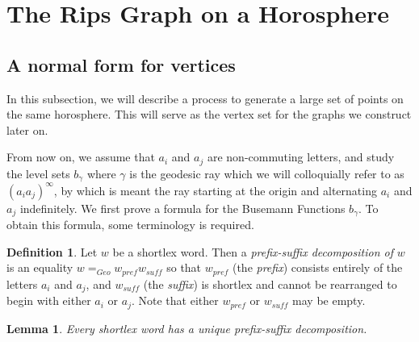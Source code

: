 \documentclass[10pt,a4paper]{amsart}
\newtheorem{lemma}[theorem]{Lemma}
\theoremstyle{definition}
\newtheorem{definition}[theorem]{Definition}
\theoremstyle{remark}
\begin{document}
	
	\section{The Rips Graph on a Horosphere}
	\label{sec:RipsGraph}
	
	\subsection{A normal form for vertices}
	\label{subsec:PrefixSuffix}
	In this subsection, we will describe a process to generate a large set of points on the same horosphere. This will serve as the vertex set for the graphs we construct later on.
	
	From now on, we assume that $a_i$ and $a_j$ are non-commuting letters, and study the level sets $b_\gamma$ where $\gamma$ is the geodesic ray which we will colloquially refer to as $(a_ia_j)^\infty$, by which is meant the ray starting at the origin and alternating $a_i$ and $a_j$ indefinitely. We first prove a formula for the Busemann Functions $b_\gamma$. To obtain this formula, some terminology is required.
	
	\begin{definition}
		
		Let $w$ be a shortlex word. Then a \textit{prefix-suffix decomposition of} $w$ is an equality $w=_{Geo}w_{pref}w_{suff}$ so that $w_{pref}$ (the \textit{prefix}) consists entirely of the letters $a_i$ and $a_j$, and $w_{suff}$ (the \textit{suffix}) is shortlex and cannot be rearranged to begin with either $a_i$ or $a_j$. Note that either $w_{pref}$ or $w_{suff}$ may be empty.
		
	\end{definition}
	
	\begin{lemma}
		
		Every shortlex word has a unique prefix-suffix decomposition.
		
	\end{lemma}
	
\end{document}
